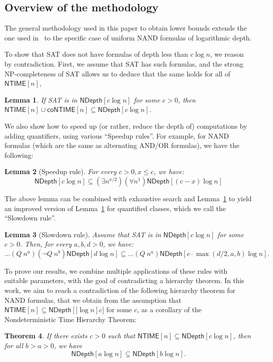 \documentclass[a4paper, 11pt]{article}
\theoremstyle{plain}
\newtheorem{theorem}{Theorem}[section] %
\newtheorem{lemma}[theorem]{Lemma}
\theoremstyle{definition}
\theoremstyle{remark}
\newcommand{\NP}{\textsf{NP}}%
\newcommand{\NTIME}{\textsf{NTIME}}%
\newcommand{\coNTIME}{\textsf{coNTIME}}%
\newcommand{\SAT}{\textsf{SAT}}%
\newcommand{\ND}{\textsf{NDepth}}%
\newcommand{\NDL}[1]{\ND\left[ #1 \log n\right]}%
\begin{document}
\subsection{Overview of the methodology}\label{sec:overview}

The general methodology used in this paper to obtain lower bounds
extends the one used in~\cite{williams2006inductive, mudigonda2020time}
to the specific case of uniform \textsf{NAND} formulas of logarithmic depth.

To show that \SAT{} does not have formulas of depth less than $c\log n$, 
we reason by contradiction.
First, we assume that \SAT{} has such formulas, and the strong \NP-completeness of \SAT{}
allows us to deduce that the same holds for all of $\NTIME[n]$, 
\begin{lemma}\label{lemma:usual_sd}
	If \SAT{} is in $\NDL{c}$ for some $c>0$,
	then $\NTIME[n] \cup \coNTIME[n] \subseteq \NDL{c}$.
\end{lemma}

We also show how to speed up (or rather, reduce the depth of) computations by adding quantifiers, 
using various ``Speedup rules''. 
For example, for NAND formulas (which are the same as alternating AND/OR formulas), we have the following:
\begin{lemma}[Speedup rule]
	For every $c > 0, x \leq c$, we have:
	\[\NDL{c} \subseteq (\exists n^{x/2}) (\forall n^1) \NDL{(c-x)}\]
\end{lemma}


The above lemma can be combined with exhaustive search and Lemma~\ref{lemma:usual_sd} 
to yield an improved version of Lemma~\ref{lemma:usual_sd} for quantified classes, 
which we call the ``Slowdown rule''.
\begin{lemma}[Slowdown rule]
	Assume that \SAT{} is in $\NDL{c}$ for some $c>0$.
	Then, for every $a,b,d > 0$, we have:
	\[\ldots (Q~n^{a}) (\neg Q~n^b) \NDL{d}
	\subseteq \ldots (Q~n^{a}) \NDL{c\cdot\max(d/2, a, b)}.\]
\end{lemma}

To prove our results, 
we combine multiple applications of these rules with suitable parameters,
with the goal of contradicting a hierarchy theorem.
In this work, we aim to reach a contradiction of the following hierarchy
theorem for NAND formulas, that we obtain from the assumption that
$\NTIME[n] \subseteq \NDL[c]$ for some $c$, 
as a corollary of the Nondeterministic Time Hierarchy Theorem:
\begin{theorem}\label{thm:nandh}
	If there exists $c > 0$ such that $\NTIME[n] \subseteq \NDL{c}$, 
	then for all $b > a > 0$, we have
	\[\NDL{a} \subsetneq \NDL{b}.\] 
\end{theorem}
\end{document}
